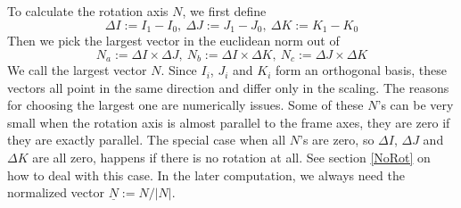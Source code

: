 \documentclass[tikz, journal, letterpaper]{IEEEtran}
\begin{document}
To calculate the rotation axis $N$, we first define 
\begin{equation}
\Delta I:= I_1 - I_0, \ \Delta J := J_1 - J_0, \ \Delta K := K_1 - K_0
\end{equation}
Then we pick the largest vector in the euclidean norm out of 
\begin{equation}
N_a := \Delta I \times \Delta J, \ N_b := \Delta I \times \Delta K, \ N_c := \Delta J \times \Delta K
\end{equation}
We call the largest vector $N$. Since $I_i$, $J_i$ and $K_i$ form an orthogonal basis, these vectors all point in the same direction and differ only in the scaling. The reasons for choosing the largest one are numerically issues. Some of these $N$'s can be very small when the rotation axis is almost parallel to the frame axes, they are zero if they are exactly parallel. The special case when all $N$'s are zero, so $\Delta I$, $\Delta J$ and $\Delta K$ are all zero, happens if there is no rotation at all. See section \ref{NoRot} on how to deal with this case. In the later computation, we always need the normalized vector $\underline{N}:=N/|N|$.
  
\end{document}
